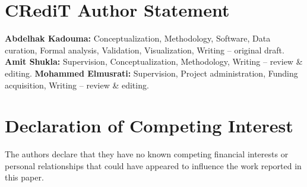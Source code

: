 \documentclass[a4paper,fleqn]{cas-dc}
\begin{document}
\section*{CRediT Author Statement}
\textbf{Abdelhak Kadouma:} Conceptualization, Methodology, Software, Data
curation, Formal analysis, Validation, Visualization, Writing -- original draft.
\textbf{Amit Shukla:} Supervision, Conceptualization, Methodology, Writing --
review \& editing.
\textbf{Mohammed Elmusrati:} Supervision, Project administration, Funding
acquisition, Writing -- review \& editing.

\section*{Declaration of Competing Interest}
The authors declare that they have no known competing financial interests or
personal relationships that could have appeared to influence the work reported
in this paper.

\FloatBarrier


\end{document}
